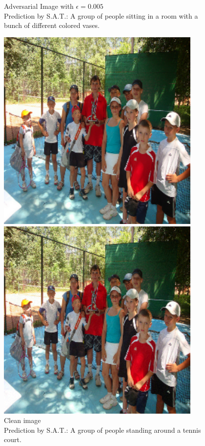 \begin{figure}[ht]
\begin{minipage}{0.45\textwidth}
        \caption*{Adversarial Image with $\epsilon=0.005$\\Prediction by S.A.T.: A group of people sitting in a room with a bunch of different colored vases.}
    \end{minipage}
\end{figure}

\begin{figure}[ht]
    \centering
    \begin{minipage}{0.45\textwidth}
        \centering
        \includegraphics[width=0.9\textwidth]{figures/fast_method_group_of_people/group_of_people_0.000.png} %
        \caption*{Clean image\\Prediction by S.A.T.: A group of people standing around a tennis court.}
    \end{minipage}\hfill
    \begin{minipage}{0.45\textwidth}
        \centering
        \includegraphics[width=0.9\textwidth]{figures/fast_method_group_of_people/group_of_people_0.010.png} %

\end{minipage}
\end{figure}
